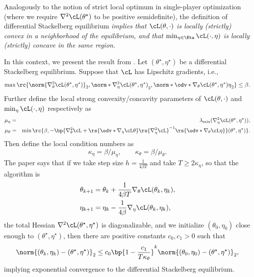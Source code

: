 \documentclass[../../book-main.tex]{subfiles}
\begin{document}
Analogously to the notion of strict local optimum in single-player
optimization (where we require \(\nabla^{2}\cL(\theta^{\star})\) to
be positive semidefinite), the definition of differential Stackelberg
equilibrium \textit{implies that \(\cL(\theta, \cdot)\) is locally
    (strictly) convex in a neighborhood of the equilibrium, and that
    \(\min_{\eta \in \Eta}\cL(\cdot, \eta)\) is locally (strictly)
concave in the same region}.

In this context, we present the result from \cite{li2022convergence}.
Let \((\theta^{\star}, \eta^{\star})\) be a differential Stackelberg
equilibrium. Suppose that \(\cL\) has Lipschitz gradients, i.e.,
\begin{equation}
    \max\rc{\norm{\nabla_{\theta}^{2}\cL(\theta^{\star},
        \eta^{\star})}_{2}, \norm*{\nabla_{\eta}^{2}\cL(\theta^{\star},
        \eta^{\star})}_{2},
        \norm*{\odv*{\nabla_{\theta}\cL(\theta^{\star},
    \eta^{\star})}{\eta}}_{2}} \leq \beta.
\end{equation}
Further define the local strong convexity/concavity parameters of
\(\cL(\theta, \cdot)\) and \(\min_{\eta}\cL(\cdot, \eta)\) respectively as
\begin{eqnarray}
    \mu_{\eta} &=& \lambda_{\min}(\nabla_{\eta}^{2}\cL(\theta^{\star},
    \eta^{\star})), \\ \mu_{\theta} &=& \min\rc{\beta,
        -\bp{\nabla_{\theta}^{2}\cL +
        \rs{\odv*{\nabla_{\eta}\cL}{\theta}}\rs{\nabla_{\eta}^{2}\cL}^{-1}\rs{\odv*{\nabla_{\theta}\cL}{\eta}}}(\theta^{\star},
    \eta^{\star})}.
\end{eqnarray}
Then define the local condition numbers as
\begin{equation}
    \kappa_{\eta} = \beta/\mu_{\eta}, \qquad \kappa_{\theta} = \beta/\mu_{\theta}.
\end{equation}
The paper \cite{li2022convergence} says that if we take step size \(h
= \frac{1}{4\beta T}\) and take \(T \geq 2\kappa_{\eta}\), so that the algorithm is
\begin{align}
    \theta_{k + 1}
    &= \theta_{k} + \frac{1}{4\beta T}\nabla_{\theta} \cL(\theta_{k},
    \eta_{k}), \\
    \eta_{k + 1}
    &= \eta_{k} - \frac{1}{4\beta}\nabla_{\eta} \cL(\theta_{k}, \eta_{k}),
\end{align}
the total Hessian \(\nabla^{2}\cL(\theta^{\star}, \eta^{\star})\) is
diagonalizable, and we initialize \((\theta_{0}, \eta_{0})\) close
enough to \((\theta^{\star}, \eta^{\star})\), then there are positive
constants \(c_{0}, c_{1} > 0\) such that
\begin{equation}
    \norm{(\theta_{k}, \eta_{k}) - (\theta^{\star},
    \eta^{\star})}_{2} \leq c_{0}\bp{1 -
    \frac{c_{1}}{T\kappa_{\theta}}}^{k}\norm{(\theta_{0}, \eta_{0}) -
    (\theta^{\star}, \eta^{\star})}_{2},
\end{equation}
implying exponential convergence to the differential Stackelberg equilibrium.
\end{document}
